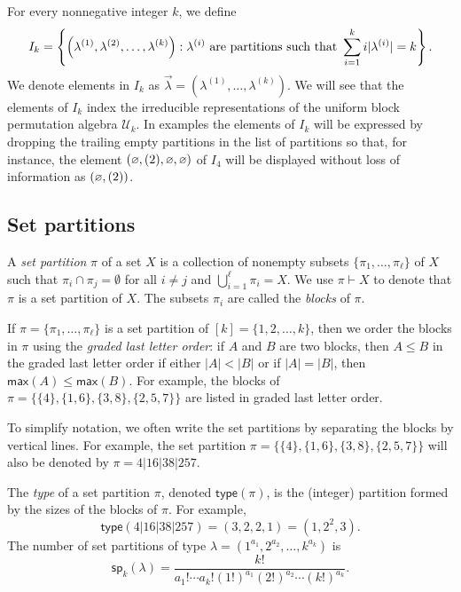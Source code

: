 \documentclass[ALCO,Unicode]{cedram}
\newcommand{\defncolor}{\color{darkred}}
\newcommand{\defn}[1]{{\defncolor\emph{#1}}} %
\newcommand{\epart}{\text{\footnotesize$\varnothing$}}
\begin{document}
For every nonnegative integer $k$, we define
\begin{equation}
\label{equation.Ik}
    I_k = \left\{ \left(\lambda^{(1)}, \lambda^{(2)}, \ldots, \lambda^{(k)}\right) : \lambda^{(i)}
    \hbox{ are partitions such that }
    \sum_{i=1}^k i |\lambda^{(i)}| = k \right\}.
\end{equation}
We denote elements in $I_k$ as $\vec{\lambda} = (\lambda^{(1)},\ldots,\lambda^{(k)})$.
We will see that the elements of $I_k$ index the irreducible representations of
the uniform block permutation algebra $\mathcal{U}_k$.  In examples the elements of
$I_k$ will be expressed by dropping the trailing empty partitions in the list of partitions
so that, for instance, the element $(\epart, (2), \epart, \epart)$ of $I_4$ will be displayed
without loss of information as $(\epart, (2))$.

\subsection{Set partitions}
\label{section.set partitions}
A \defn{set partition} $\pi$ of a set $X$ is a collection of nonempty subsets $\{\pi_1, \ldots, \pi_\ell\}$ of $X$ such that
$\pi_i \cap \pi_j = \emptyset$ for all $i \neq j$ and $\bigcup_{i=1}^{\ell} \pi_i = X$.  We use $\pi \vdash X$ to denote that $\pi$
is a set partition of $X$. The subsets $\pi_i$ are called the \defn{blocks} of $\pi$.

If $\pi = \{\pi_1, \ldots, \pi_\ell\}$ is a set partition of $[k] = \{1, 2, \ldots, k\}$,
then we order the blocks in $\pi$ using the \defn{graded last letter order}: if $A$ and $B$ are two blocks, then
$A\leqslant B$ in the graded last letter order if either $|A|<|B|$ or if $|A|=|B|$, then $\mathsf{max}(A)\leqslant \mathsf{max}(B)$.
For example, the blocks of $\pi = \{\{4\}, \{1,6\},\{3,8\},\{2,5,7\}\}$ are listed in graded last letter order.

To simplify notation, we often write the set partitions by separating the blocks by vertical lines. For example, the set partition
$\pi = \{\{4\}, \{1,6\},\{3,8\},\{2,5,7\}\}$ will also be denoted by $\pi = 4|16|38|257$.

The \defn{type} of a set partition $\pi$, denoted $\mathsf{type}(\pi)$,
is the (integer) partition formed by the sizes of the blocks of $\pi$.
For example,
\begin{equation*}
    \mathsf{type}(4|16|38|257) = (3,2,2,1) = (1, 2^2, 3).
\end{equation*}
The number of set partitions of type $\lambda = (1^{a_1}, 2^{a_2}, \ldots, k^{a_k})$ is
\begin{equation}\label{eq:nosetpartitions}
    \mathsf{sp}_k(\lambda) = \frac{k!}{a_1! \cdots a_k!(1!)^{a_1}(2!)^{a_2} \cdots (k!)^{a_k}}.
\end{equation}
\end{document}
